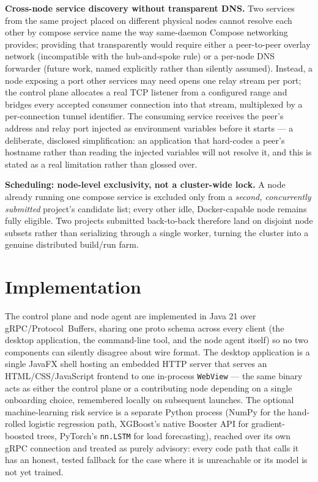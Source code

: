 \documentclass[conference]{IEEEtran}
\begin{document}
\textbf{Cross-node service discovery without transparent DNS.} Two services from the same project
placed on different physical nodes cannot resolve each other by compose service name the way
same-daemon Compose networking provides; providing that transparently would require either a
peer-to-peer overlay network (incompatible with the hub-and-spoke rule) or a per-node DNS forwarder
(future work, named explicitly rather than silently assumed). Instead, a node exposing a port other
services may need opens one relay stream per port; the control plane allocates a real TCP listener
from a configured range and bridges every accepted consumer connection into that stream, multiplexed
by a per-connection tunnel identifier. The consuming service receives the peer's address and relay
port injected as environment variables before it starts — a deliberate, disclosed simplification: an
application that hard-codes a peer's hostname rather than reading the injected variables will not
resolve it, and this is stated as a real limitation rather than glossed over.

\textbf{Scheduling: node-level exclusivity, not a cluster-wide lock.} A node already running one
compose service is excluded only from a \emph{second, concurrently submitted} project's candidate
list; every other idle, Docker-capable node remains fully eligible. Two projects submitted
back-to-back therefore land on disjoint node subsets rather than serializing through a single worker,
turning the cluster into a genuine distributed build/run farm.

\section{Implementation}
\label{sec:implementation}

The control plane and node agent are implemented in Java 21 over gRPC/Protocol~Buffers, sharing one
proto schema across every client (the desktop application, the command-line tool, and the node agent
itself) so no two components can silently disagree about wire format. The desktop application is a
single JavaFX shell hosting an embedded HTTP server that serves an HTML/CSS/JavaScript frontend to one
in-process \texttt{WebView} — the same binary acts as either the control plane or a contributing node
depending on a single onboarding choice, remembered locally on subsequent launches. The optional
machine-learning risk service is a separate Python process (NumPy for the hand-rolled logistic
regression path, XGBoost's native Booster API for gradient-boosted trees, PyTorch's
\texttt{nn.LSTM} for load forecasting), reached over its own gRPC connection and treated as purely
advisory: every code path that calls it has an honest, tested fallback for the case where it is
unreachable or its model is not yet trained.
\end{document}
